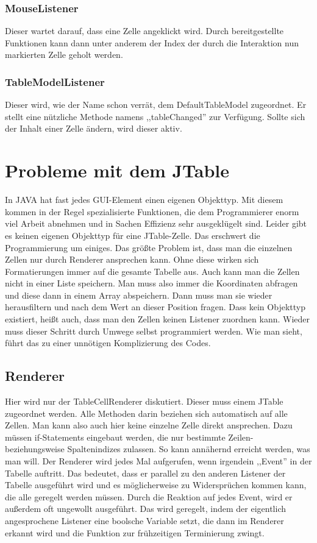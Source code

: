\documentclass[12pt]{report}
\begin{document}
\subsubsection{MouseListener}
Dieser wartet darauf, dass eine Zelle angeklickt wird. Durch bereitgestellte Funktionen kann dann unter anderem der Index der durch die Interaktion nun markierten Zelle geholt werden.

\subsubsection{TableModelListener}
Dieser wird, wie der Name schon verrät, dem DefaultTableModel zugeordnet. Er stellt eine nützliche Methode namens ,,tableChanged'' zur Verfügung. Sollte sich der Inhalt einer Zelle ändern, wird dieser aktiv.

\section{Probleme mit dem JTable}
In JAVA hat fast jedes GUI-Element einen eigenen Objekttyp. Mit diesem kommen in der Regel spezialisierte Funktionen, die dem Programmierer enorm viel Arbeit abnehmen und in Sachen Effizienz sehr ausgeklügelt sind. Leider gibt es keinen eigenen Objekttyp für eine JTable-Zelle. Das erschwert die Programmierung um einiges. Das größte Problem ist, dass man die einzelnen Zellen nur durch Renderer ansprechen kann. Ohne diese wirken sich Formatierungen immer auf die gesamte Tabelle aus. Auch kann man die Zellen nicht in einer Liste speichern. Man muss also immer die Koordinaten abfragen und diese dann in einem Array abspeichern. Dann muss man sie wieder herausfiltern und nach dem Wert an dieser Position fragen. Dass kein Objekttyp existiert, heißt auch, dass man den Zellen keinen Listener zuordnen kann. Wieder muss dieser Schritt durch Umwege selbst programmiert werden. Wie man sieht, führt das zu einer unnötigen Komplizierung des Codes.

\subsection{Renderer}
Hier wird nur der TableCellRenderer diskutiert. Dieser muss einem JTable zugeordnet werden. Alle Methoden darin beziehen sich automatisch auf alle Zellen. Man kann also auch hier keine einzelne Zelle direkt ansprechen. Dazu müssen if-Statements eingebaut werden, die nur bestimmte Zeilen- beziehungsweise Spaltenindizes zulassen. So kann annähernd erreicht werden, was man will. Der Renderer wird jedes Mal aufgerufen, wenn irgendein ,,Event'' in der Tabelle auftritt. Das bedeutet, dass er parallel zu den anderen Listener der Tabelle ausgeführt wird und es möglicherweise zu Widersprüchen kommen kann, die alle geregelt werden müssen. Durch die Reaktion auf jedes Event, wird er außerdem oft ungewollt ausgeführt. Das wird geregelt, indem der eigentlich angesprochene Listener eine boolsche Variable setzt, die dann im Renderer erkannt wird und die Funktion zur frühzeitigen Terminierung zwingt.
\end{document}
